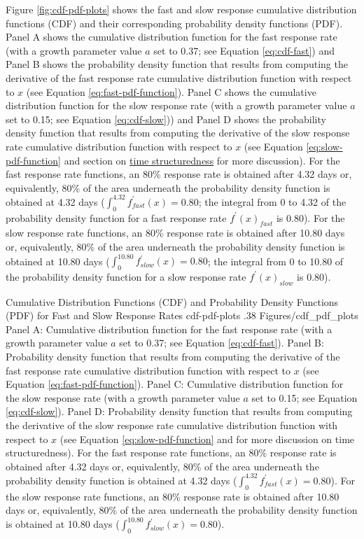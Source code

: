 \documentclass[
12pt, %
twoside,
english]{guelphthesis}
\theoremstyle{definition}
\theoremstyle{definition}
\theoremstyle{definition}
\theoremstyle{definition}
\theoremstyle{remark}
\begin{document}
Figure \ref{fig:cdf-pdf-plots} shows the fast and slow response
cumulative distribution functions (CDF) and their corresponding
probability density functions (PDF). Panel A shows the cumulative
distribution function for the fast response rate (with a growth
parameter value \(a\) set to 0.37; see Equation \ref{eq:cdf-fast}) and
Panel B shows the probability density function that results from
computing the derivative of the fast response rate cumulative
distribution function with respect to \(x\) (see Equation
\ref{eq:fast-pdf-function}). Panel C shows the cumulative distribution
function for the slow response rate (with a growth parameter value \(a\)
set to 0.15; see Equation \ref{eq:cdf-slow})) and Panel D shows the
probability density function that results from computing the derivative
of the slow response rate cumulative distribution function with respect
to \(x\) (see Equation \ref{eq:slow-pdf-function} and section on \protect\hyperlink{sec:time-structuredness}{time
structuredness} for more discussion). For the
fast response rate functions, an 80\% response rate is obtained after
4.32 days or, equivalently, 80\% of the area underneath the probability
density function is obtained at 4.32 days
(\(\int^{4.32}_{0} f_{fast}^\prime (x) = 0.80\); the integral from 0 to 4.32 of the probability density function for a fast response rate \(f^\prime(x)_{fast}\) is 0.80). For the slow response
rate functions, an 80\% response rate is obtained after 10.80 days or,
equivalently, 80\% of the area underneath the probability density
function is obtained at 10.80 days
(\(\int^{10.80}_{0} f_{slow}^\prime (x) = 0.80\); the integral from 0 to 10.80 of the probability density function for a slow response rate \(f^\prime(x)_{slow}\) is 0.80).
\begin{apaFigure}
[portrait]
[samepage]
[0cm]
{Cumulative Distribution Functions (CDF) and Probability Density Functions (PDF) for Fast and Slow Response Rates}
{cdf-pdf-plots}
{.38}
{Figures/cdf_pdf_plots}
{Panel A: Cumulative distribution function for the fast response rate (with a growth parameter value $a$ set to 0.37; see Equation \ref{eq:cdf-fast}). Panel B: Probability density function that results from computing the derivative of the fast response rate cumulative distribution function with respect to $x$ (see Equation \ref{eq:fast-pdf-function}). Panel C: Cumulative distribution function for the slow response rate (with a growth parameter value $a$ set to 0.15; see Equation \ref{eq:cdf-slow}). Panel D: Probability density function that results from computing the derivative of the slow response rate cumulative distribution function with respect to $x$ (see Equation \ref{eq:slow-pdf-function} and  for more discussion on time structuredness). For the fast response rate functions, an 80\% response rate is obtained after 4.32 days or, equivalently, 80\% of the area underneath the probability density function is obtained at 4.32 days ($\int^{4.32}_{0} f_{fast}^\prime (x) = 0.80$). For the slow response rate functions, an 80\% response rate is obtained after 10.80 days or, equivalently, 80\% of the area underneath the probability density function is obtained at 10.80 days ($\int^{10.80}_{0} f_{slow}^\prime (x) = 0.80$).}
\end{apaFigure}
\end{document}
